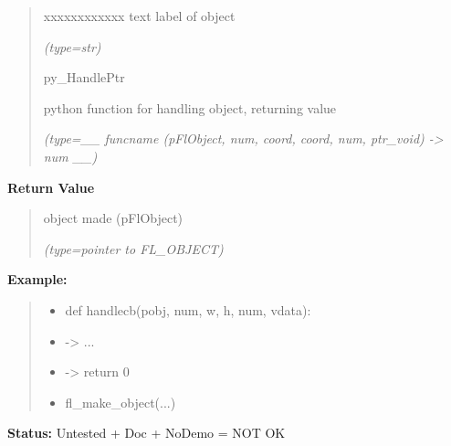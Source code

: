 \begin{boxedminipage}{\funcwidth}
\begin{quote}
\begin{Ventry}{xxxxxxxxxxxx}
          text label of object

            {\it (type=str)}

          \item[py\_HandlePtr]

          python function for handling object, returning value

            {\it (type=\_\_ funcname (pFlObject, num, coord, coord, num, ptr\_void) 
-{\textgreater} num \_\_)}

        \end{Ventry}

      \end{quote}

      \textbf{Return Value}
    \vspace{-1ex}

      \begin{quote}
      object made (pFlObject)

      {\it (type=pointer to FL\_OBJECT)}

      \end{quote}

\textbf{Example:}
\begin{quote}
  \begin{itemize}

  \item
    \setlength{\parskip}{0.6ex}
def handlecb(pobj, num, w, h, num, vdata):



  \item {\textbar}-{\textgreater}{\textbar} ...



  \item {\textbar}-{\textgreater}{\textbar} return 0



  \item fl\_make\_object(...)



\end{itemize}

\end{quote}

\textbf{Status:} Untested + Doc + NoDemo = NOT OK



    \end{boxedminipage}

    \label{xformslib:flbasic:fl_add_child}

